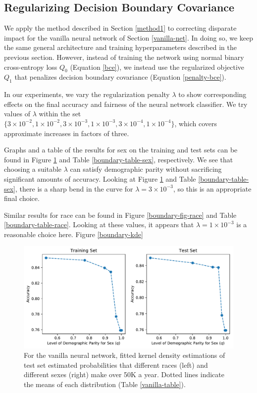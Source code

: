 \documentclass{article}
\begin{document}
\subsection{Regularizing Decision Boundary Covariance}

We apply the method described in Section \ref{method1} to correcting disparate impact for the vanilla neural network of Section \ref{vanilla-net}.  In doing so, we keep the same general architecture and training hyperparameters described in the previous section.  However, instead of training the network using normal binary cross-entropy loss $Q_0$  (Equation \ref{bce}), we instead use the regularized objective $Q_1$ that penalizes decision boundary covariance (Equation \ref{penalty-bce}).  

In our experiments, we vary the regularization penalty $\lambda$ to show corresponding effects on the final accuracy and fairness of the neural network classifier.  We try values of $\lambda$ within the set $\{3 \times 10^{-2}, 1 \times 10^{-2}, 3 \times 10^{-3}, 1 \times 10^{-3}, 3 \times 10^{-4}, 1 \times 10^{-4}\}$, which covers approximate increases in factors of three.  

Graphs and a table of the results for sex on the training and test sets can be found in Figure \ref{boundary-fig-sex} and Table \ref{boundary-table-sex}, respectively.  We see that choosing a suitable $\lambda$ can satisfy demographic parity without sacrificing significant amounts of accuracy.  Looking at Figure \ref{boundary-fig-sex} and Table \ref{boundary-table-sex}, there is a sharp bend in the curve for $\lambda = 3 \times 10^{-3}$, so this is an appropriate final choice.

Similar results for race can be found in Figure \ref{boundary-fig-race} and Table \ref{boundary-table-race}.  Looking at these values, it appears that $\lambda = 1 \times 10^{-3}$ is a reasonable choice here.  Figure \ref{boundary-kde}   


\begin{figure}[ht]
\vskip 0.2in
\begin{center}
\centerline{\includegraphics[width=\columnwidth]{img/boundary-tradeoff-sex.pdf}}
\caption{For the vanilla neural network, fitted kernel density estimations of test set estimated probabilities that different races (left) and different sexes (right) make over 50K a year.  Dotted lines indicate the means of each distribution (Table \ref{vanilla-table}).}
\label{boundary-fig-sex}
\end{center}
\vskip -0.2in
\end{figure}
\end{document}
